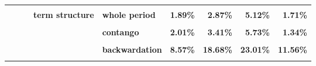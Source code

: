 \documentclass[
  authoryear,
  preprint,
  3p]{elsarticle}
\begin{document}
\begin{landscape}
\begin{longtable}[t]{>{}l>{}l>{}l>{}l>{}l>{}r>{}r>{}r>{}r}
\addlinespace
\textbf{\cellcolor{gray!10}{}} & \textbf{\cellcolor{gray!10}{}} & \textbf{\cellcolor{gray!10}{}} & \textbf{\cellcolor{gray!10}{}} & \textbf{\cellcolor{gray!10}{contango}} & \textcolor[HTML]{4285f4}{\textbf{\cellcolor{gray!10}{7.95\%}}} & \textcolor[HTML]{4285f4}{\textbf{\cellcolor{gray!10}{7.61\%}}} & \textcolor[HTML]{4285f4}{\textbf{\cellcolor{gray!10}{5.24\%}}} & \textcolor[HTML]{4285f4}{\textbf{\cellcolor{gray!10}{5.82\%}}}\\
\textbf{} & \textbf{} & \textbf{} & \textbf{term structure} & \textbf{whole period} & \textcolor[HTML]{4285f4}{\textbf{1.89\%}} & \textcolor[HTML]{4285f4}{\textbf{2.87\%}} & \textcolor[HTML]{4285f4}{\textbf{5.12\%}} & \textcolor[HTML]{4285f4}{\textbf{1.71\%}}\\
\textbf{\cellcolor{gray!10}{}} & \textbf{\cellcolor{gray!10}{}} & \textbf{\cellcolor{gray!10}{}} & \textbf{\cellcolor{gray!10}{}} & \textbf{\cellcolor{gray!10}{backwardation}} & \textcolor[HTML]{4285f4}{\textbf{\cellcolor{gray!10}{2.3\%}}} & \textcolor[HTML]{4285f4}{\textbf{\cellcolor{gray!10}{2.78\%}}} & \textcolor[HTML]{4285f4}{\textbf{\cellcolor{gray!10}{4.79\%}}} & \textcolor[HTML]{4285f4}{\textbf{\cellcolor{gray!10}{2.85\%}}}\\
\textbf{} & \textbf{} & \textbf{} & \textbf{} & \textbf{contango} & \textcolor[HTML]{4285f4}{\textbf{2.01\%}} & \textcolor[HTML]{4285f4}{\textbf{3.41\%}} & \textcolor[HTML]{4285f4}{\textbf{5.73\%}} & \textcolor[HTML]{4285f4}{\textbf{1.34\%}}\\
\textbf{\cellcolor{gray!10}{}} & \textbf{\cellcolor{gray!10}{agriculturals}} & \textbf{\cellcolor{gray!10}{all}} & \textbf{\cellcolor{gray!10}{market}} & \textbf{\cellcolor{gray!10}{whole period}} & \textcolor[HTML]{4285f4}{\textbf{\cellcolor{gray!10}{9.08\%}}} & \textcolor[HTML]{4285f4}{\textbf{\cellcolor{gray!10}{16.04\%}}} & \textcolor[HTML]{4285f4}{\textbf{\cellcolor{gray!10}{25.99\%}}} & \textcolor[HTML]{4285f4}{\textbf{\cellcolor{gray!10}{12.07\%}}}\\
\addlinespace
\textbf{} & \textbf{} & \textbf{} & \textbf{} & \textbf{backwardation} & \textcolor[HTML]{4285f4}{\textbf{8.57\%}} & \textcolor[HTML]{4285f4}{\textbf{18.68\%}} & \textcolor[HTML]{4285f4}{\textbf{23.01\%}} & \textcolor[HTML]{4285f4}{\textbf{11.56\%}}\\
\textbf{\cellcolor{gray!10}{}} & \textbf{\cellcolor{gray!10}{}} & \textbf{\cellcolor{gray!10}{}} & \textbf{\cellcolor{gray!10}{}} & \textbf{\cellcolor{gray!10}{contango}} & \textcolor[HTML]{4285f4}{\textbf{\cellcolor{gray!10}{9.85\%}}} & \textcolor[HTML]{4285f4}{\textbf{\cellcolor{gray!10}{13.5\%}}} & \textcolor[HTML]{4285f4}{\textbf{\cellcolor{gray!10}{28.67\%}}} & \textcolor[HTML]{4285f4}{\textbf{\cellcolor{gray!10}{12.91\%}}}\\

\end{longtable}
\end{landscape}
\end{document}
